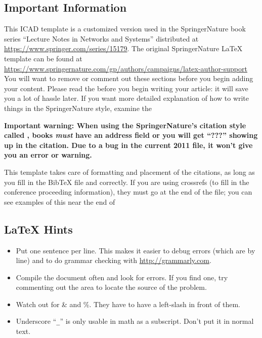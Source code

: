 \documentclass[sn-mathphys,pdflatex]{sn-jnl}%
\theoremstyle{thmstyleone}%
\theoremstyle{thmstyletwo}%
\theoremstyle{thmstylethree}%
\begin{document}
\subsection*{Important Information}\label{sec:important-info}
This ICAD template is a customized version used in the SpringerNature book series ``Lecture Notes in Networks and Systems'' distributed at \url{https://www.springer.com/series/15179}.
The original SpringerNature \LaTeX{} template can be found at \url{https://www.springernature.com/gp/authors/campaigns/latex-author-support}
You will want to remove or comment out these sections before you begin adding your content.
Please read the  before you begin writing your article:  it will save you a lot of hassle later.
If you want more detailed explanation of how to write things in the SpringerNature style, examine the 

\textbf{Important warning:  When using the SpringerNature's citation style called , books {\em must\/} have an address field or you will get ``???'' showing up in the citation.
  Due to a bug in the current 2011  file, it won't give you an error or warning.}

  This template takes care of formatting and placement of the citations, as long as you fill in the BibTeX file  and  correctly.
  If you are using crossrefs (to fill in the conference proceeding information), they must go at the end of the  file;  you can see examples of this near the end of 

\subsection*{\LaTeX{} Hints}\label{sec:latex-hints}
\begin{itemize}
\item Put one sentence per line.
  This makes it easier to debug errors (which are by line) and to do grammar checking with \url{http://grammarly.com}.
\item Compile the document often and look for errors.
  If you find one, try commenting out the area to locate the source of the problem.
\item Watch out for \& and \%.  They have to have a left-slash in front of them.
\item Underscore ``\verb|_|'' is only usable in math as a subscript.
  Don't put it in normal text.
\end{itemize}
\end{document}

